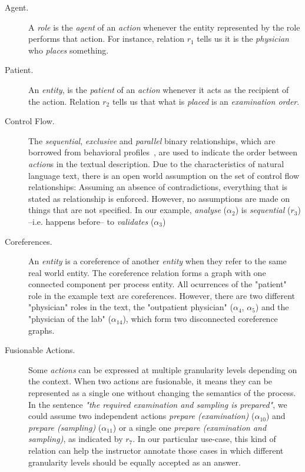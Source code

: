 \begin{description}
\item[Agent.]{A \emph{role} is the \emph{agent} of an \emph{action} whenever the
    entity represented by the role performs that action. 
    For instance, relation $r_1$ tells us it is the \emph{physician} who \emph{places} something.}
\item[Patient.]{An \emph{entity}, is the \emph{patient} of an \emph{action}
    whenever it acts as the recipient of the action. Relation $r_2$ tells us
    that what is \emph{placed} is an \emph{examination order}.}
\item[Control Flow.]{The \emph{sequential}, \emph{exclusive} and \emph{parallel}
    binary relationships, which are borrowed from behavioral
    profiles~\cite{smirnov2010business}, are used to indicate the order between \emph{action}s
    in the textual description. Due to the characteristics of natural language
    text, there is an open world assumption on the set of control flow
    relationships: Assuming an absence of contradictions, everything that is
    stated as relationship is enforced. However, no assumptions are made on
    things that are not specified. 
    In our example, \emph{analyse} ($\alpha_2$) is \emph{sequential} ($r_3$) --i.e. happens before--
    to \emph{validates} ($\alpha_3$)}
\item[Coreferences.]{An \emph{entity} is a coreference of another \emph{entity} when
    they refer to the same real world entity. The coreference relation forms a graph with
    one connected component per process entity. All ocurrences of the "patient" role in the
    example text are coreferences. However, there are two different "physician" 
    roles in the text, the "outpatient physician" ($\alpha_4$, $\alpha_5$) and the 
    "physician of the lab" ($\alpha_{14}$), which form two disconnected coreference graphs.}
\item[Fusionable Actions.]{Some \emph{actions} can be expressed at multiple
    granularity levels depending on the context. When two actions are
    fusionable, it means they can be represented as a single one without
    changing the semantics of the process. In the sentence \emph{"the required examination 
    and sampling is prepared"}, we could assume two independent actions \emph{prepare 
    (examination)} ($\alpha_{10}$) and \emph{prepare (sampling)} ($\alpha_{11}$) or a single 
    one \emph{prepare (examination  and sampling)}, as indicated by $r_7$. In our particular
    use-case, this kind of relation can help the instructor annotate those cases in which different
    granularity levels should be equally accepted as an answer.}
\end{description}

